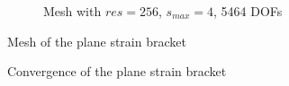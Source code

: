 \begin{figure}[H]\ContinuedFloat
    \begin{subfigure}[b]{1\linewidth}
        \centering
        \caption{Mesh with $res=256$, $s_{max}=4$, 5464 DOFs}
    \end{subfigure}
    \caption[Mesh of the plane strain bracket]{Mesh of the plane strain bracket}
    \label{qdt_fig:ex_bracket_mesh_all}
\end{figure}

\begin{figure}[H]
    \centering
    \caption[Convergence of the plane strain bracket]{Convergence of the plane strain bracket}
    \label{qdt_fig:ex_bracket_mesh_conv}
\end{figure}


